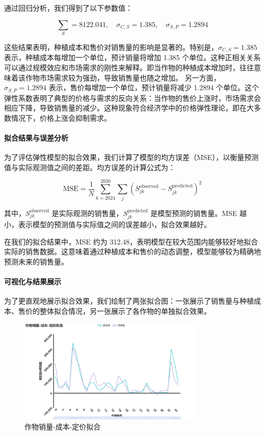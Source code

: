 \documentclass[12pt,a4paper]{nmmcm}
\begin{document}
通过回归分析，我们得到了以下参数值：

\[
\sum_S = 8122.041, \quad \sigma_{C,S} = 1.385, \quad \sigma_{S,P} = 1.2894
\]

这些结果表明，种植成本和售价对销售量的影响是显著的。特别是，$\sigma_{C,S} = 1.385$ 表示，种植成本每增加一个单位，预计销量将增加 1.385 个单位。这种正相关关系可以通过规模效应和市场需求的刚性来解释。即当作物的种植成本增加时，往往意味着该作物市场需求较为强劲，导致销售量也随之增加。
另一方面，$\sigma_{S,P} = 1.2894$ 表示，售价每增加一个单位，预计销量将减少 1.2894 个单位。这个弹性系数表明了典型的价格与需求的反向关系：当作物的售价上涨时，市场需求会相应下降，导致销售量的减少。这种现象符合经济学中的价格弹性理论，即在大多数情况下，价格上涨会抑制需求。

\paragraph{拟合结果与误差分析}

为了评估弹性模型的拟合效果，我们计算了模型的均方误差（MSE），以衡量预测值与实际观测值之间的差距。均方误差的计算公式为：

\[
\text{MSE} = \frac{1}{N} \sum_{k=2024}^{2030} \sum_{j} \left( S_{jk}^{\text{observed}} - S_{jk}^{\text{predicted}} \right)^2
\]

其中，$S_{jk}^{\text{observed}}$ 是实际观测的销售量，$S_{jk}^{\text{predicted}}$ 是模型预测的销售量。MSE 越小，表示模型的预测值与实际值之间的误差越小，拟合效果越好。

在我们的拟合结果中，MSE 约为 312.48，表明模型在较大范围内能够较好地拟合实际的销售数据。这意味着通过种植成本和售价的动态调整，模型能够较为精确地预测未来的销售量。

\paragraph{可视化与结果展示}

为了更直观地展示拟合效果，我们绘制了两张拟合图：一张展示了销售量与种植成本、售价的整体拟合情况，另一张展示了各作物的单独拟合效果。

\begin{figure}[H]
  \centering
  \includegraphics[width=0.8\textwidth]{figures/prob3/correlation/作物销量-成本-定价拟合.png}
  \caption{作物销量-成本-定价拟合}
  \label{fig:fitting1}
\end{figure}
\end{document}
